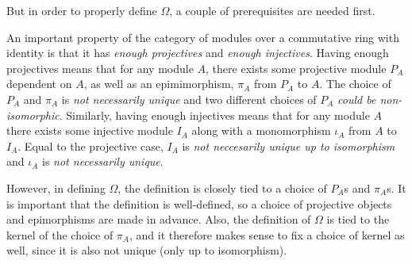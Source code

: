 But in order to properly define \( \Omega \), a couple of prerequisites are needed first.

An important property of the category of modules over a commutative ring with identity is that it has \emph{enough projectives} and \emph{enough injectives}. Having enough projectives means that for any module \( A \), there exists some projective module \( P_A \) dependent on \( A \), as well as an epimimorphism, \( \pi_A \) from \( P_A \) to \( A \). The choice of \( P_A \) and \( \pi_A \) is \emph{not necessarily unique} and two different choices of \( P_A \) \emph{could be non-isomorphic}. Similarly, having enough injectives means that for any module \( A \) there exists some injective module \( I_A \) along with a monomorphism \( \iota_A \) from \( A \) to \( I_A \). Equal to the projective case, \( I_A \) is \emph{not neccesarily unique up to isomorphism} and \( \iota_A \) is \emph{not necessarily unique}.

However, in defining \( \Omega \), the definition is closely tied to a choice of \( P_A \)s and \( \pi_A \)s. It is important that the definition is well-defined, so a choice of projective objects and epimorphisms are made in advance. Also, the definition of \( \Omega \) is tied to the kernel of the choice of \( \pi_A \), and it therefore makes sense to fix a choice of kernel as well, since it is also not unique (only up to isomorphism).



